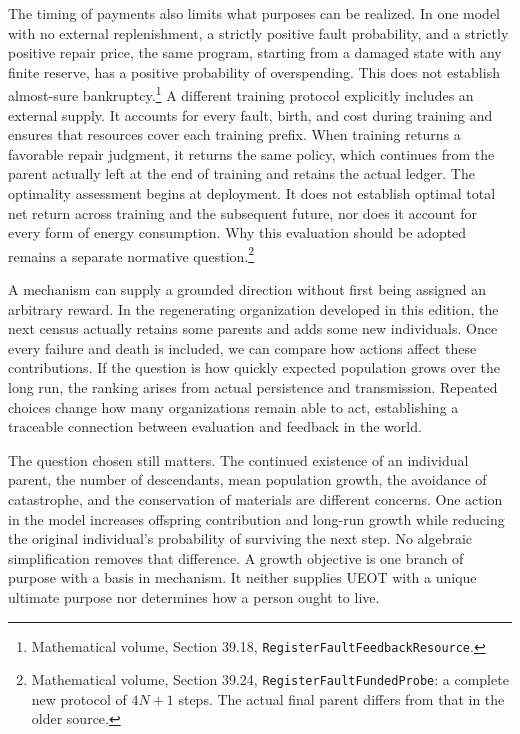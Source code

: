 \documentclass[
  english,
  11pt,
  oneside]{book}
\begin{document}
The timing of payments also limits what purposes can be realized. In one model with no external replenishment, a strictly positive fault probability, and a strictly positive repair price, the same program, starting from a damaged state with any finite reserve, has a positive probability of overspending. This does not establish almost-sure bankruptcy.\footnote{\hypertarget{ph-note-32}{}Mathematical volume, Section 39.18, \nolinkurl{RegisterFaultFeedbackResource}.} A different training protocol explicitly includes an external supply. It accounts for every fault, birth, and cost during training and ensures that resources cover each training prefix. When training returns a favorable repair judgment, it returns the same policy, which continues from the parent actually left at the end of training and retains the actual ledger. The optimality assessment begins at deployment. It does not establish optimal total net return across training and the subsequent future, nor does it account for every form of energy consumption. Why this evaluation should be adopted remains a separate normative question.\footnote{\hypertarget{ph-note-33}{}Mathematical volume, Section 39.24, \texttt{RegisterFaultFundedProbe}: a complete new protocol of \(4N+1\) steps. The actual final parent differs from that in the older source.}

A mechanism can supply a grounded direction without first being assigned an arbitrary reward. In the regenerating organization developed in this edition, the next census actually retains some parents and adds some new individuals. Once every failure and death is included, we can compare how actions affect these contributions. If the question is how quickly expected population grows over the long run, the ranking arises from actual persistence and transmission. Repeated choices change how many organizations remain able to act, establishing a traceable connection between evaluation and feedback in the world.

The question chosen still matters. The continued existence of an individual parent, the number of descendants, mean population growth, the avoidance of catastrophe, and the conservation of materials are different concerns. One action in the model increases offspring contribution and long-run growth while reducing the original individual's probability of surviving the next step. No algebraic simplification removes that difference. A growth objective is one branch of purpose with a basis in mechanism. It neither supplies UEOT with a unique ultimate purpose nor determines how a person ought to live.
\end{document}
